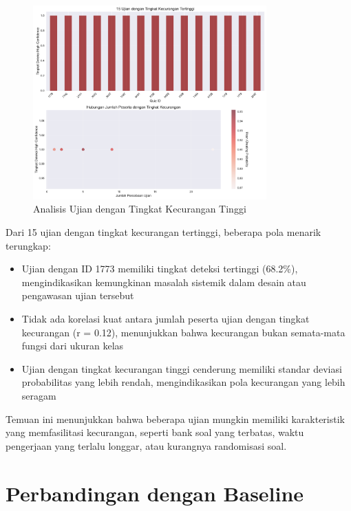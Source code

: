 \begin{figure}[htbp]
    \centering
    \includegraphics[width=0.8\textwidth]{figures/quiz_analysis.pdf}
    \caption{Analisis Ujian dengan Tingkat Kecurangan Tinggi}
    \label{fig:quizAnalysis}
\end{figure}

Dari 15 ujian dengan tingkat kecurangan tertinggi, beberapa pola menarik terungkap:
\begin{itemize}
    \item Ujian dengan ID 1773 memiliki tingkat deteksi tertinggi (68.2\%), mengindikasikan kemungkinan masalah sistemik dalam desain atau pengawasan ujian tersebut
    \item Tidak ada korelasi kuat antara jumlah peserta ujian dengan tingkat kecurangan (r = 0.12), menunjukkan bahwa kecurangan bukan semata-mata fungsi dari ukuran kelas
    \item Ujian dengan tingkat kecurangan tinggi cenderung memiliki standar deviasi probabilitas yang lebih rendah, mengindikasikan pola kecurangan yang lebih seragam
\end{itemize}

Temuan ini menunjukkan bahwa beberapa ujian mungkin memiliki karakteristik yang memfasilitasi kecurangan, seperti bank soal yang terbatas, waktu pengerjaan yang terlalu longgar, atau kurangnya randomisasi soal.

\section{Perbandingan dengan Baseline}
\label{sec:perbandinganBaseline}

